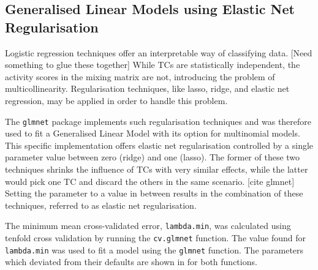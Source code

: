 \subsection{Generalised Linear Models using Elastic Net Regularisation} \label{sec:methods:glmnet}
Logistic regression techniques offer an interpretable way of classifying data.
[Need something to glue these together]
While TCs are statistically independent, the activity scores in the mixing matrix are not, introducing the problem of multicollinearity.
Regularisation techniques, like lasso, ridge, and elastic net regression, may be applied in order to handle this problem. \cite{glmnet:reg}

The \verb|glmnet| package implements such regularisation techniques and was therefore used to fit a Generalised Linear Model with its option for multinomial models.
This specific implementation offers elastic net regularisation controlled by a single parameter value between zero (ridge) and one (lasso).
The former of these two techniques shrinks the influence of TCs with very similar effects, while the latter would pick one TC and discard the others in the same scenario. [cite glmnet]
Setting the parameter to a value in between results in the combination of these techniques, referred to as elastic net regularisation.

The minimum mean cross-validated error, \verb|lambda.min|, was calculated using tenfold cross validation by running the \verb|cv.glmnet| function.
The value found for \verb|lambda.min| was used to fit a model using the \verb|glmnet| function.
The parameters which deviated from their defaults are shown in  for both functions.



